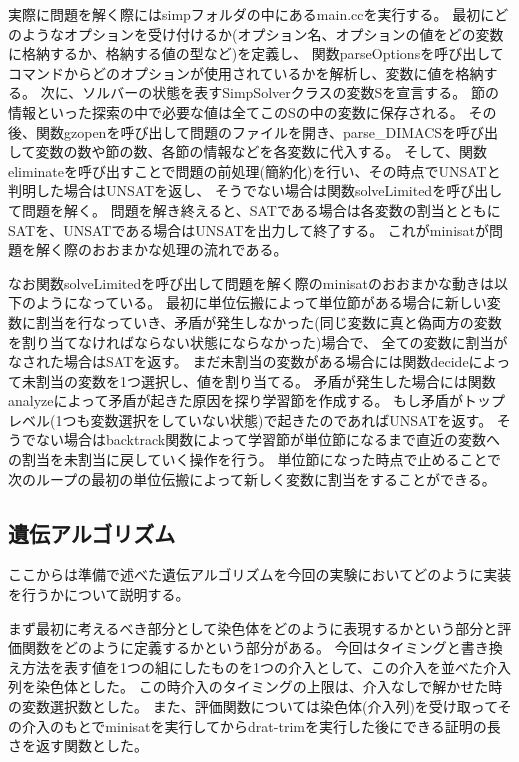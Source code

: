 実際に問題を解く際にはsimpフォルダの中にあるmain.ccを実行する。
最初にどのようなオプションを受け付けるか(オプション名、オプションの値をどの変数に格納するか、格納する値の型など)を定義し、
関数parseOptionsを呼び出してコマンドからどのオプションが使用されているかを解析し、変数に値を格納する。
次に、ソルバーの状態を表すSimpSolverクラスの変数Sを宣言する。
節の情報といった探索の中で必要な値は全てこのSの中の変数に保存される。
その後、関数gzopenを呼び出して問題のファイルを開き、parse\_DIMACSを呼び出して変数の数や節の数、各節の情報などを各変数に代入する。
そして、関数eliminateを呼び出すことで問題の前処理(簡約化)を行い、その時点でUNSATと判明した場合はUNSATを返し、
そうでない場合は関数solveLimitedを呼び出して問題を解く。
問題を解き終えると、SATである場合は各変数の割当とともにSATを、UNSATである場合はUNSATを出力して終了する。
これがminisatが問題を解く際のおおまかな処理の流れである。

なお関数solveLimitedを呼び出して問題を解く際のminisatのおおまかな動きは以下のようになっている。
最初に単位伝搬によって単位節がある場合に新しい変数に割当を行なっていき、矛盾が発生しなかった(同じ変数に真と偽両方の変数を割り当てなければならない状態にならなかった)場合で、
全ての変数に割当がなされた場合はSATを返す。
まだ未割当の変数がある場合には関数decideによって未割当の変数を1つ選択し、値を割り当てる。
矛盾が発生した場合には関数analyzeによって矛盾が起きた原因を探り学習節を作成する。
もし矛盾がトップレベル(1つも変数選択をしていない状態)で起きたのであればUNSATを返す。
そうでない場合はbacktrack関数によって学習節が単位節になるまで直近の変数への割当を未割当に戻していく操作を行う。
単位節になった時点で止めることで次のループの最初の単位伝搬によって新しく変数に割当をすることができる。





\subsection{遺伝アルゴリズム}



ここからは準備で述べた遺伝アルゴリズムを今回の実験においてどのように実装を行うかについて説明する。

まず最初に考えるべき部分として染色体をどのように表現するかという部分と評価関数をどのように定義するかという部分がある。
今回はタイミングと書き換え方法を表す値を1つの組にしたものを1つの介入として、この介入を並べた介入列を染色体とした。
この時介入のタイミングの上限は、介入なしで解かせた時の変数選択数とした。
また、評価関数については染色体(介入列)を受け取ってその介入のもとでminisatを実行してからdrat-trimを実行した後にできる証明の長さを返す関数とした。

